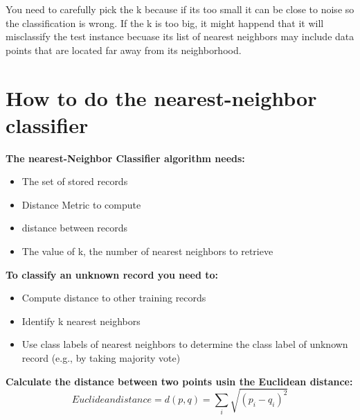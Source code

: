		You need to carefully pick the k because if its too small it can be close to noise
		so the classification is wrong. If the k is too big, it might happend that it
		will misclassify the test instance becuase its list of nearest neighbors may include
		data points that are located far away from its neighborhood.

		\clearpage
		\section{How to do the nearest-neighbor classifier}
		\clearpage
		{\bf The nearest-Neighbor Classifier algorithm needs:}
			\begin{itemize}
				\item The set of stored records 
				\item Distance Metric to compute 
				\item distance between records
				\item The value of k, the number of nearest neighbors to retrieve 
			\end{itemize}
		{\bf To classify an unknown record you need to:}
			\begin{itemize}
				\item Compute distance to other training records
				\item Identify k nearest neighbors 
				\item Use class labels of nearest neighbors to determine the class 
				label of unknown record (e.g., by taking majority vote)
			\end{itemize}

		{\bf Calculate the distance between two points usin the Euclidean distance:}
		\begin{equation}
			Euclidean distance = d(p,q) = \sum_{i}^{} \sqrt{(p_{i} - q_{i})^{2}}
		\end{equation}